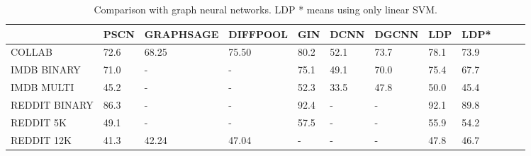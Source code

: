 \documentclass[11pt,onecolumn]{article}
\newcommand{\DOM}       {{LDP}\xspace}
\begin{document}
\begin{table}[]
\label{tab: t3}
\centering
\begin{tabular}{@{}llllllllllll@{}}
\toprule
                       & PSCN & GRAPHSAGE & DIFFPOOL & GIN  & DCNN   & DGCNN    & \DOM{}   &\DOM{}*\\ \midrule
COLLAB                       & 72.6              & 68.25             & 75.50    &80.2    &52.1  & 73.7            & 78.1        &73.9\\
IMDB BINARY               & 71.0             & -                     & -            &75.1    & 49.1 & 70.0            & 75.4        & 67.7\\
IMDB MULTI                        & 45.2             & -                     & -            & 52.3    & 33.5  &     47.8            & 50.0        & 45.4\\
REDDIT BINARY           & 86.3            & -                    & -            &92.4    &-        &  -            &92.1         & 89.8\\
REDDIT 5K                   & 49.1             & -                     & -            &57.5    & -         &  -            &55.9         & 54.2\\
REDDIT 12K                 & 41.3             & 42.24             & 47.04     &-        &-         & -            & 47.8        & 46.7\\ \bottomrule
\end{tabular}
\caption{Comparison with graph neural networks. LDP * means using only linear SVM.}
\end{table}
\end{document}
